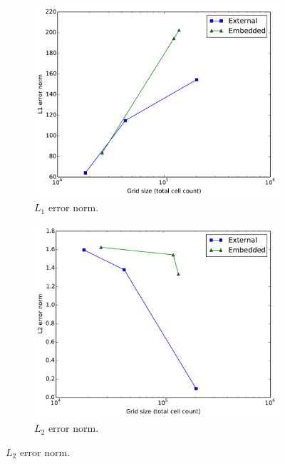 \documentclass[preprint,12pt]{elsarticle}
\begin{document}
\begin{figure}[htbp]
    \centering
    \begin{subfigure}{0.5\textwidth}
        \includegraphics[width=\linewidth]{L1_error_norm}
        \caption{$L_1$ error norm.}
    \end{subfigure}

    \begin{subfigure}{0.5\textwidth}
        \includegraphics[width=\linewidth]{L2_error_norm}
        \caption{$L_2$ error norm.}
    \end{subfigure}


\end{figure}
\end{document}
